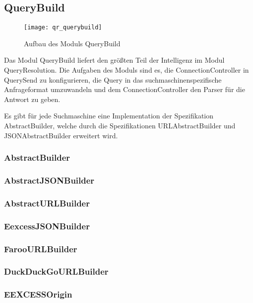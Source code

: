 
\subsection{QueryBuild}

\begin{figure}[htb]
  \texttt{[image: qr\_querybuild]}
  \caption{Aufbau des Moduls QueryBuild}
	\label{fig:Aufbau des Moduls QueryBuild}
\end{figure}

Das Modul QueryBuild liefert den größten Teil der Intelligenz im Modul QueryResolution. Die Aufgaben des Moduls sind es, die ConnectionController in QuerySend zu konfigurieren, die Query in das suchmaschinenspezifische Anfrageformat umzuwandeln und dem ConnectionController den Parser für die Antwort zu geben.

Es gibt für jede Suchmaschine eine Implementation der Spezifikation AbstractBuilder, welche durch die Spezifikationen URLAbstractBuilder und JSONAbstractBuilder erweitert wird.

\subsubsection{AbstractBuilder}
\subsubsection{AbstractJSONBuilder}
\subsubsection{AbstractURLBuilder}
\subsubsection{EexcessJSONBuilder}
\subsubsection{FarooURLBuilder}
\subsubsection{DuckDuckGoURLBuilder}
\subsubsection{EEXCESSOrigin}

